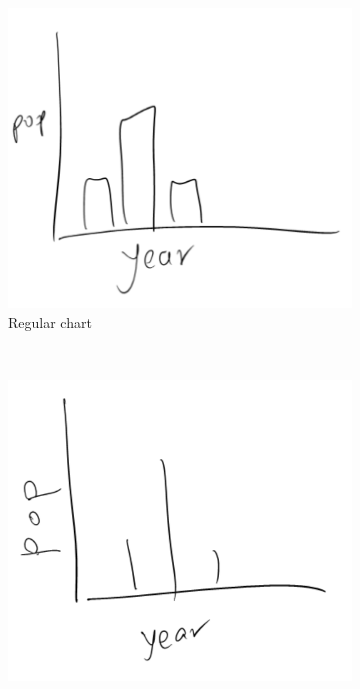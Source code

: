 	\begin{figure}[H]
        \centering
        \begin{subfigure}[b]{0.5\textwidth}
                \includegraphics[width=\textwidth]{collection1}
                \caption{Regular chart}
                \label{fig:regular}
        \end{subfigure}%
        ~ %
        \begin{subfigure}[b]{0.5\textwidth}
                \includegraphics[width=\textwidth]{collection2}

\end{subfigure}
\end{figure}

